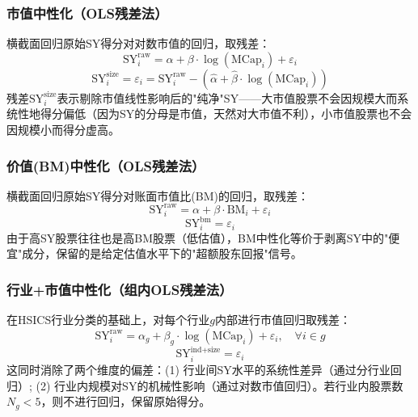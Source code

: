 \documentclass[10pt,a4paper]{ctexart}
\begin{document}
\subsubsection{市值中性化（OLS残差法）}

横截面回归原始SY得分对对数市值的回归，取残差：
\begin{equation}
\text{SY}_i^{\text{raw}} = \alpha + \beta \cdot \log(\text{MCap}_i) + \varepsilon_i
\end{equation}
\begin{equation}
\text{SY}_i^{\text{size}} = \varepsilon_i = \text{SY}_i^{\text{raw}} - (\hat{\alpha} + \hat{\beta} \cdot \log(\text{MCap}_i))
\end{equation}
残差$\text{SY}_i^{\text{size}}$表示剔除市值线性影响后的"纯净"SY——大市值股票不会因规模大而系统性地得分偏低（因为SY的分母是市值，天然对大市值不利），小市值股票也不会因规模小而得分虚高。

\subsubsection{价值(BM)中性化（OLS残差法）}

横截面回归原始SY得分对账面市值比(BM)的回归，取残差：
\begin{equation}
\text{SY}_i^{\text{raw}} = \alpha + \beta \cdot \text{BM}_i + \varepsilon_i
\end{equation}
\begin{equation}
\text{SY}_i^{\text{bm}} = \varepsilon_i
\end{equation}
由于高SY股票往往也是高BM股票（低估值），BM中性化等价于剥离SY中的"便宜"成分，保留的是给定估值水平下的"超额股东回报"信号。

\subsubsection{行业+市值中性化（组内OLS残差法）}

在HSICS行业分类的基础上，对每个行业$g$内部进行市值回归取残差：
\begin{equation}
\text{SY}_i^{\text{raw}} = \alpha_g + \beta_g \cdot \log(\text{MCap}_i) + \varepsilon_i, \quad \forall i \in g
\end{equation}
\begin{equation}
\text{SY}_i^{\text{ind+size}} = \varepsilon_i
\end{equation}
这同时消除了两个维度的偏差：(1) 行业间SY水平的系统性差异（通过分行业回归）; (2) 行业内规模对SY的机械性影响（通过对数市值回归）。若行业内股票数$N_g < 5$，则不进行回归，保留原始得分。
\end{document}
